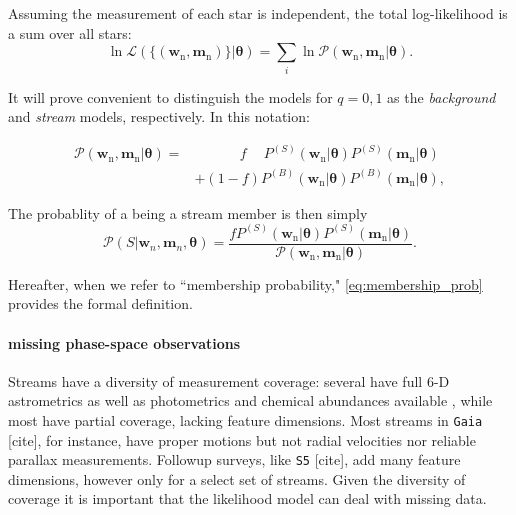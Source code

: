 \documentclass[twocolumn]{aastex631}
\newcommand{\dataarchive}[1]{\texttt{#1}}
\newcommand{\mrm}[1]{\mathrm{#1}}
\newcommand{\mbs}[1]{\boldsymbol{#1}}
\newcommand{\mcal}[1]{\mathcal{#1}}
\newcommand{\pdf}{\mcal{P}}
\newcommand{\nth}[1]{{#1}_{\mrm{n}}}  %
\begin{document}
        Assuming the measurement of each star is independent, the total
        log-likelihood is a sum over all stars:
        \begin{equation}
            \ln\mcal{L}\left(\{(\nth{\mbs{w}},\nth{\mbs{m}})\} | \mbs{\theta}\right) = \sum_i  \ln \pdf(\nth{\mbs{w}}, \nth{\mbs{m}} | \mbs{\theta}).
        \end{equation}

        It will prove convenient to distinguish the models for $q=0,1$ as the
        \textit{background} and \textit{stream} models, respectively. In this
        notation:

        \begin{align}
            \pdf(\nth{\mbs{w}}, \nth{\mbs{m}} | \mbs{\theta})
            =& \phantom{+} \qquad f \phantom{+} P^{(S)}(\nth{\mbs{w}}|\mbs{\theta}) P^{(S)}(\nth{\mbs{m}}|\mbs{\theta}) \\
            & + (1-f) P^{(B)}(\nth{\mbs{w}}|\mbs{\theta}) P^{(B)}(\nth{\mbs{m}}|\mbs{\theta}), \nonumber
        \end{align}

        The probablity of a being a stream member is then simply
        \begin{equation}\label{eq:membership_prob}
            \pdf\left(S | \mbs{w}_n, \mbs{m}_n, \mbs{\theta} \right) = \frac{f P^{(S)}(\nth{\mbs{w}}|\mbs{\theta}) P^{(S)}(\nth{\mbs{m}}|\mbs{\theta}) }{ \pdf(\nth{\mbs{w}}, \nth{\mbs{m}} | \mbs{\theta})}.
        \end{equation}

        Hereafter, when we refer to ``membership probability,"
        \autoref{eq:membership_prob} provides the formal definition.


        \paragraph{missing phase-space observations}

            Streams have a diversity of measurement coverage: several have full 6-D astrometrics as well as photometrics and chemical abundances available \citep[e.g.,][]{Koposov2019, 2020A&A...635L...3A, 2022ApJ...928...30L}, while most have partial coverage, lacking feature dimensions.
            Most streams in \dataarchive{Gaia} {\color{red} [cite]}, for instance, have proper motions but not radial velocities nor reliable parallax measurements. Followup surveys, like \dataarchive{S5} {\color{red} [cite]}, add many feature dimensions, however only for a select set of streams. Given the diversity of coverage it is important that the likelihood model can deal with missing data.
\end{document}
